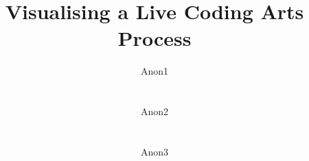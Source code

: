 \documentclass{sig-alternate}
\begin{document}

\title{Visualising a Live Coding Arts Process}

\author{
\alignauthor Anon1\\
       \affaddr{-}\\
       \affaddr{-}\\
       \email{-}
\alignauthor Anon2\\
       \affaddr{-}\\
       \affaddr{-}\\
       \email{-}
\alignauthor Anon3\\
       \affaddr{-}\\
       \affaddr{-}\\
       \email{-}
}
\end{document}
